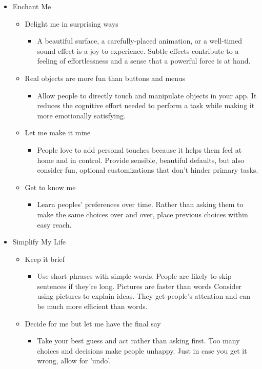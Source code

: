 \begin{itemize}
\item Enchant Me
\begin{itemize}
\item Delight me in surprising ways
\begin{itemize}
\item A beautiful surface, a carefully-placed animation, or a well-timed sound effect is a joy to experience. Subtle effects contribute to a feeling of effortlessness and a sense that a powerful force is at hand.
\end{itemize}
\item Real objects are more fun than buttons and menus
\begin{itemize}
\item Allow people to directly touch and manipulate objects in your app. It reduces the cognitive effort needed to perform a task while making it more emotionally satisfying.
\end{itemize}
\item Let me make it mine
\begin{itemize}
\item People love to add personal touches because it helps them feel at home and in control. Provide sensible, beautiful defaults, but also consider fun, optional customizations that don't hinder primary tasks.
\end{itemize}
\item Get to know me
\begin{itemize}
\item Learn peoples' preferences over time. Rather than asking them to make the same choices over and over, place previous choices within easy reach.
\end{itemize}
\end{itemize}
\item Simplify My Life
\begin{itemize}
\item Keep it brief
\begin{itemize}
\item Use short phrases with simple words. People are likely to skip sentences if they're long.
Pictures are faster than words
Consider using pictures to explain ideas. They get people's attention and can be much more efficient than words.
\end{itemize}
\item Decide for me but let me have the final say
\begin{itemize}
\item Take your best guess and act rather than asking first. Too many choices and decisions make people unhappy. Just in case you get it wrong, allow for 'undo'.

\end{itemize}
\end{itemize}
\end{itemize}
